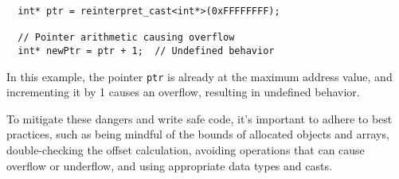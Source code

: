 \documentclass{article}
\begin{document}
\begin{enumerate}
\begin{enumerate}
  \begin{verbatim}
  int* ptr = reinterpret_cast<int*>(0xFFFFFFFF);
  
  // Pointer arithmetic causing overflow
  int* newPtr = ptr + 1;  // Undefined behavior
  \end{verbatim}
  
  In this example, the pointer \texttt{ptr} is already at the maximum address value, and incrementing it by 1 causes an overflow, resulting in undefined behavior.
\end{enumerate}

To mitigate these dangers and write safe code, it's important to adhere to best practices, such as being mindful of the bounds of allocated objects and arrays, double-checking the offset calculation, avoiding operations that can cause overflow or underflow, and using appropriate data types and casts.

\end{enumerate}
\end{document}
